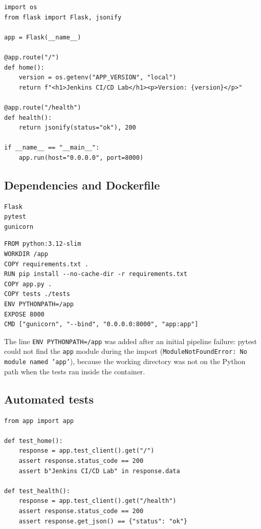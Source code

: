 \documentclass[11pt,a4paper]{article}
\begin{document}
\begin{lstlisting}[caption={app.py}]
import os
from flask import Flask, jsonify

app = Flask(__name__)

@app.route("/")
def home():
    version = os.getenv("APP_VERSION", "local")
    return f"<h1>Jenkins CI/CD Lab</h1><p>Version: {version}</p>"

@app.route("/health")
def health():
    return jsonify(status="ok"), 200

if __name__ == "__main__":
    app.run(host="0.0.0.0", port=8000)
\end{lstlisting}

\subsection{Dependencies and Dockerfile}

\begin{lstlisting}[caption={requirements.txt}]
Flask
pytest
gunicorn
\end{lstlisting}

\begin{lstlisting}[caption={Dockerfile of the application.}]
FROM python:3.12-slim
WORKDIR /app
COPY requirements.txt .
RUN pip install --no-cache-dir -r requirements.txt
COPY app.py .
COPY tests ./tests
ENV PYTHONPATH=/app
EXPOSE 8000
CMD ["gunicorn", "--bind", "0.0.0.0:8000", "app:app"]
\end{lstlisting}

The line \texttt{ENV PYTHONPATH=/app} was added after an initial pipeline failure: pytest
could not find the \texttt{app} module during the import
(\texttt{ModuleNotFoundError: No module named 'app'}), because the working directory was
not on the Python path when the tests ran inside the container.

\subsection{Automated tests}

\begin{lstlisting}[caption={tests/test\_app.py}]
from app import app

def test_home():
    response = app.test_client().get("/")
    assert response.status_code == 200
    assert b"Jenkins CI/CD Lab" in response.data

def test_health():
    response = app.test_client().get("/health")
    assert response.status_code == 200
    assert response.get_json() == {"status": "ok"}
\end{lstlisting}
\end{document}
